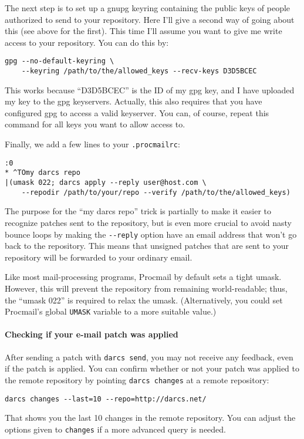 \documentclass{book}
\begin{document}
The next step is to set up a gnupg keyring containing the public keys of
people authorized to send to your repository.  Here I'll give a second way of
going about this (see above for the first).  This time I'll assume you
want to give me write access to your repository.  You can do this by:
\begin{verbatim}
gpg --no-default-keyring \
    --keyring /path/to/the/allowed_keys --recv-keys D3D5BCEC
\end{verbatim}
This works because ``D3D5BCEC'' is the ID of my gpg key, and I have
uploaded my key to the gpg keyservers.  Actually, this also requires that
you have configured gpg to access a valid keyserver.  You can, of course,
repeat this command for all keys you want to allow access to.

Finally, we add a few lines to your \verb!.procmailrc!:
\begin{verbatim}
:0
* ^TOmy darcs repo
|(umask 022; darcs apply --reply user@host.com \
    --repodir /path/to/your/repo --verify /path/to/the/allowed_keys)
\end{verbatim}
The purpose for the ``my darcs repo'' trick is partially to make it easier
to recognize patches sent to the repository, but is even more crucial to
avoid nasty bounce loops by making the \verb!--reply! option have an email
address that won't go back to the repository.  This means that unsigned
patches that are sent to your repository will be forwarded to your ordinary
email.

Like most mail-processing programs, Procmail by default sets a tight umask.
However, this will prevent the repository from remaining world-readable;
thus, the ``umask 022'' is required to relax the umask.
(Alternatively, you could set Procmail's global \verb!UMASK! variable
to a more suitable value.)

\paragraph{Checking if your e-mail patch was applied}

After sending a patch with \verb!darcs send!, you may not receive any feedback,
even if the patch is applied. You can confirm whether or not your patch was applied
to the remote repository by pointing \verb!darcs changes! at a remote repository:
\begin{verbatim}
darcs changes --last=10 --repo=http://darcs.net/
\end{verbatim}

That shows you the last 10 changes in the remote repository. You can adjust the options given
to \verb!changes! if a more advanced query is needed.
\end{document}
